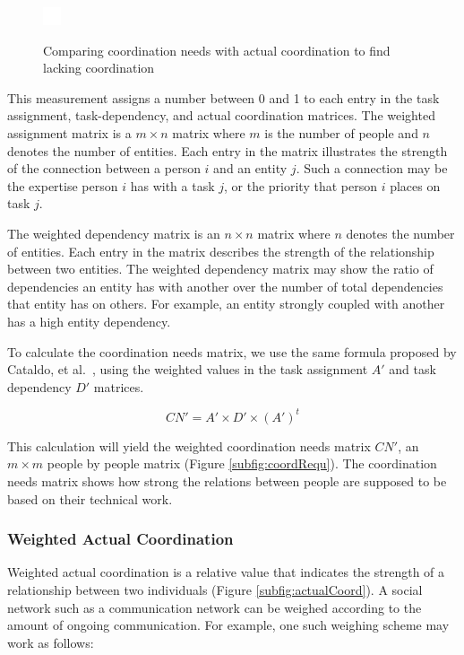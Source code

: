 \begin{figure}
{    \includegraphics[width=20px]{figures/whitespace}
    \label{subfig:coordLack}
  }
	\caption{Comparing coordination needs with actual coordination to find lacking coordination}
	\label{fig:communication}
\end{figure}

This measurement assigns a number between 0 and 1 to each entry in the task assignment, task-dependency, and actual coordination matrices.
The weighted assignment matrix is a $m\times n$ matrix where $m$ is the number of people and $n$ denotes the number of entities. 
Each entry in the matrix illustrates the strength of the connection between a person $i$ and an entity $j$. Such a connection may be the expertise person $i$ has with a task $j$, or the priority that person $i$ places on task $j$.

The weighted dependency matrix is an $n\times n$ matrix where $n$ denotes the number of entities.
Each entry in the matrix describes the strength of the relationship between two entities. The weighted dependency matrix may show the ratio of dependencies an entity has with another over the number of total dependencies that entity has on others. 
For example, an entity strongly coupled with another has a high entity dependency.

To calculate the coordination needs matrix, we use the same formula proposed by Cataldo, et al.~\cite{cataldo2006:coordination_reqs}, using the weighted values in the task assignment $A'$ and task dependency $D'$ matrices.

\[ CN' = A' \times D' \times (A')^t \]

\noindent This calculation will yield the weighted coordination needs matrix $CN'$, an $m\times m$ people by people matrix (Figure \ref{subfig:coordRequ}).
The coordination needs matrix shows how strong the relations between people are supposed to be based on their technical work.

\subsubsection{Weighted Actual Coordination}

Weighted actual coordination is a relative value that indicates the strength of a relationship between two individuals (Figure \ref{subfig:actualCoord}). A social network such as a communication network can be weighed according to the amount of ongoing communication. For example, one such weighing scheme may work as follows:

